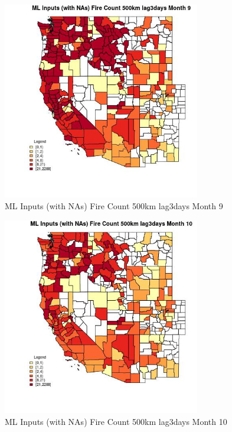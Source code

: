 \begin{figure} 
\centering  
\includegraphics[width=0.77\textwidth]{Code_Outputs/Report_ML_input_PM25_Step4_part_e_de_duplicated_aves_compiled_2019-05-21wNAs_CountyFire_Count_500km_lag3daysmedianMonth9.jpg} 
\caption{\label{fig:Report_ML_input_PM25_Step4_part_e_de_duplicated_aves_compiled_2019-05-21wNAsCountyFire_Count_500km_lag3daysmedianMonth9}ML Inputs (with NAs) Fire Count 500km lag3days Month 9} 
\end{figure} 
 

\begin{figure} 
\centering  
\includegraphics[width=0.77\textwidth]{Code_Outputs/Report_ML_input_PM25_Step4_part_e_de_duplicated_aves_compiled_2019-05-21wNAs_CountyFire_Count_500km_lag3daysmedianMonth10.jpg} 
\caption{\label{fig:Report_ML_input_PM25_Step4_part_e_de_duplicated_aves_compiled_2019-05-21wNAsCountyFire_Count_500km_lag3daysmedianMonth10}ML Inputs (with NAs) Fire Count 500km lag3days Month 10} 
\end{figure} 
 

